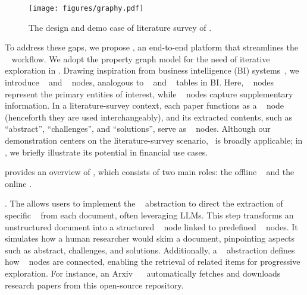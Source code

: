 \begin{figure*}[t]
  \centering
  \texttt{[image: figures/graphy.pdf]}
  \caption{The design and demo case of literature survey of \sys.}
  \label{fig:graphy}
  \vspace*{-1em}
\end{figure*}

To address these gaps, we propose \sys, an end-to-end platform that streamlines the \problem~ workflow.
We adopt the property graph model for the need of iterative exploration in \problem.
Drawing inspiration from business intelligence (BI) systems~\cite{gray1996datacube}, we introduce \fact~ and \dimension~ nodes, analogous to \fact~ and \dimension~ tables in BI. Here, \fact~ nodes represent the primary entities of interest, while \dimension~ nodes capture supplementary information. In a literature-survey context, each paper functions as a \fact~ node (henceforth they are used interchangeably), and its extracted contents, such as ``abstract'', ``challenges'', and ``solutions'', serve as \dimension~ nodes. Although our demonstration centers on the literature-survey scenario, \sys~is broadly applicable; in , we briefly illustrate its potential in financial use cases.

 provides an overview of \sys, which consists of two main roles: the offline \scrapper~ and the online \surveyor.

.
The \scrapper allows users to implement the \inspector~ abstraction to direct the extraction of specific
\dimensions~ from each document, often leveraging LLMs.
This step transforms an unstructured document into a structured \fact~ node%
linked to predefined \dimension~ nodes. It simulates how a human researcher would skim a document, pinpointing aspects such as abstract, challenges, and solutions. Additionally, a \navigator~ abstraction defines how \fact~ nodes are connected, enabling the retrieval of related items for progressive exploration. For instance, an Arxiv~\cite{arxiv} \navigator~ automatically fetches and downloads research papers from this open-source repository.



